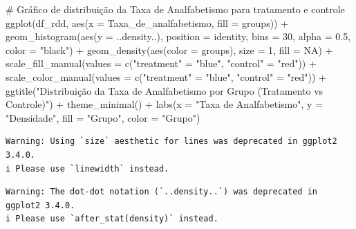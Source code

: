 \documentclass[
  letterpaper,
  DIV=11,
  numbers=noendperiod]{scrartcl}
\newenvironment{Shaded}{\begin{snugshade}}{\end{snugshade}}
\newcommand{\AttributeTok}[1]{\textcolor[rgb]{0.40,0.45,0.13}{#1}}
\newcommand{\CommentTok}[1]{\textcolor[rgb]{0.37,0.37,0.37}{#1}}
\newcommand{\ConstantTok}[1]{\textcolor[rgb]{0.56,0.35,0.01}{#1}}
\newcommand{\DecValTok}[1]{\textcolor[rgb]{0.68,0.00,0.00}{#1}}
\newcommand{\FloatTok}[1]{\textcolor[rgb]{0.68,0.00,0.00}{#1}}
\newcommand{\FunctionTok}[1]{\textcolor[rgb]{0.28,0.35,0.67}{#1}}
\newcommand{\NormalTok}[1]{\textcolor[rgb]{0.00,0.23,0.31}{#1}}
\newcommand{\OtherTok}[1]{\textcolor[rgb]{0.00,0.23,0.31}{#1}}
\newcommand{\SpecialCharTok}[1]{\textcolor[rgb]{0.37,0.37,0.37}{#1}}
\newcommand{\StringTok}[1]{\textcolor[rgb]{0.13,0.47,0.30}{#1}}
\begin{document}
\begin{Shaded}
\begin{Highlighting}[]
\CommentTok{\# Gráfico de distribuição da Taxa de Analfabetismo para tratamento e controle}
\FunctionTok{ggplot}\NormalTok{(df\_rdd, }\FunctionTok{aes}\NormalTok{(}\AttributeTok{x =}\NormalTok{ Taxa\_de\_analfabetismo, }\AttributeTok{fill =}\NormalTok{ groups)) }\SpecialCharTok{+}
  \FunctionTok{geom\_histogram}\NormalTok{(}\FunctionTok{aes}\NormalTok{(}\AttributeTok{y =}\NormalTok{ ..density..), }\AttributeTok{position =} \StringTok{\textquotesingle{}identity\textquotesingle{}}\NormalTok{, }\AttributeTok{bins =} \DecValTok{30}\NormalTok{, }\AttributeTok{alpha =} \FloatTok{0.5}\NormalTok{, }\AttributeTok{color =} \StringTok{"black"}\NormalTok{) }\SpecialCharTok{+}
  \FunctionTok{geom\_density}\NormalTok{(}\FunctionTok{aes}\NormalTok{(}\AttributeTok{color =}\NormalTok{ groups), }\AttributeTok{size =} \DecValTok{1}\NormalTok{, }\AttributeTok{fill =} \ConstantTok{NA}\NormalTok{) }\SpecialCharTok{+}
  \FunctionTok{scale\_fill\_manual}\NormalTok{(}\AttributeTok{values =} \FunctionTok{c}\NormalTok{(}\StringTok{"treatment"} \OtherTok{=} \StringTok{"blue"}\NormalTok{, }\StringTok{"control"} \OtherTok{=} \StringTok{"red"}\NormalTok{)) }\SpecialCharTok{+}
  \FunctionTok{scale\_color\_manual}\NormalTok{(}\AttributeTok{values =} \FunctionTok{c}\NormalTok{(}\StringTok{"treatment"} \OtherTok{=} \StringTok{"blue"}\NormalTok{, }\StringTok{"control"} \OtherTok{=} \StringTok{"red"}\NormalTok{)) }\SpecialCharTok{+}
  \FunctionTok{ggtitle}\NormalTok{(}\StringTok{"Distribuição da Taxa de Analfabetismo por Grupo (Tratamento vs Controle)"}\NormalTok{) }\SpecialCharTok{+}
  \FunctionTok{theme\_minimal}\NormalTok{() }\SpecialCharTok{+}
  \FunctionTok{labs}\NormalTok{(}\AttributeTok{x =} \StringTok{"Taxa de Analfabetismo"}\NormalTok{, }\AttributeTok{y =} \StringTok{"Densidade"}\NormalTok{, }\AttributeTok{fill =} \StringTok{"Grupo"}\NormalTok{, }\AttributeTok{color =} \StringTok{"Grupo"}\NormalTok{)}
\end{Highlighting}
\end{Shaded}

\begin{verbatim}
Warning: Using `size` aesthetic for lines was deprecated in ggplot2 3.4.0.
i Please use `linewidth` instead.
\end{verbatim}

\begin{verbatim}
Warning: The dot-dot notation (`..density..`) was deprecated in ggplot2 3.4.0.
i Please use `after_stat(density)` instead.
\end{verbatim}
\end{document}
